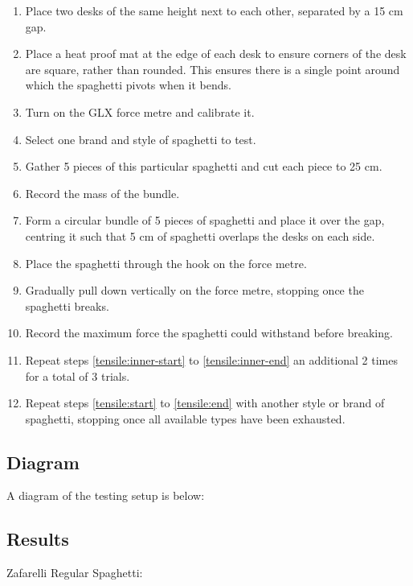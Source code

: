 \documentclass[a4paper,11pt]{article}
\begin{document}
\begin{enumerate}
\item Place two desks of the same height next to each other, separated by a 15
	cm gap.
\item Place a heat proof mat at the edge of each desk to ensure corners of the
	desk are square, rather than rounded. This ensures there is a single
	point around which the spaghetti pivots when it bends.
\item Turn on the GLX force metre and calibrate it.
\item \label{tensile:start} Select one brand and style of spaghetti to test.
\item \label{tensile:inner-start} Gather 5 pieces of this particular spaghetti
	and cut each piece to 25 cm.
\item Record the mass of the bundle.
\item Form a circular bundle of 5 pieces of spaghetti and place it over the gap,
	centring it such that 5 cm of spaghetti overlaps the desks on each side.
\item Place the spaghetti through the hook on the force metre.
\item Gradually pull down vertically on the force metre, stopping once the
	spaghetti breaks.
\item \label{tensile:inner-end} Record the maximum force the spaghetti could
	withstand before breaking.
\item \label{tensile:end} Repeat steps \ref{tensile:inner-start} to
	\ref{tensile:inner-end} an additional 2 times for a total of 3 trials.
\item Repeat steps \ref{tensile:start} to \ref{tensile:end} with another
	style or brand of spaghetti, stopping once all available types have been
	exhausted.
\end{enumerate}


\subsection{Diagram}

A diagram of the testing setup is below:

\vspace{5cm}


\subsection{Results}

Zafarelli Regular Spaghetti:
\end{document}
